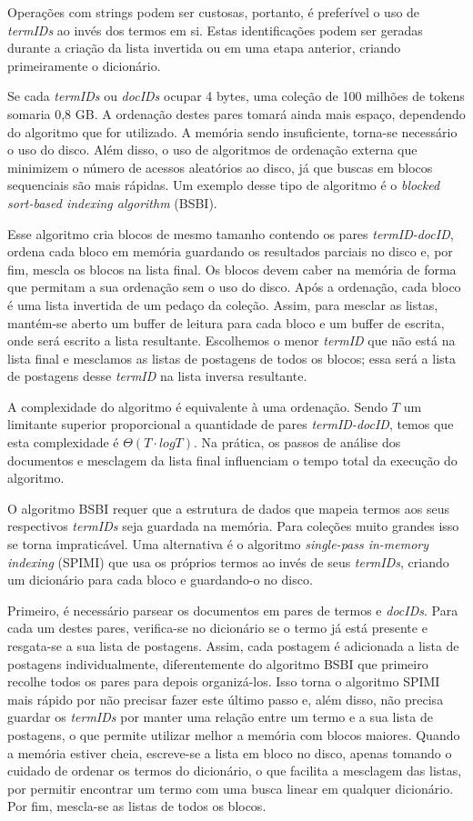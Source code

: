 Operações com strings podem ser custosas, portanto, é preferível o uso de \emph{termIDs} ao invés dos termos em si. Estas identificações podem ser geradas durante a criação da lista invertida ou em uma etapa anterior, criando primeiramente o dicionário.

Se cada \emph{termIDs} ou \emph{docIDs} ocupar 4 bytes, uma coleção de 100 milhões de tokens somaria 0,8 GB. A ordenação destes pares tomará ainda mais espaço, dependendo do algoritmo que for utilizado. A memória sendo insuficiente, torna-se necessário o uso do disco. Além disso, o uso de algoritmos de ordenação externa que minimizem o número de acessos aleatórios ao disco, já que buscas em blocos sequenciais são mais rápidas. Um exemplo desse tipo de algoritmo é o \emph{blocked sort-based indexing algorithm} (BSBI). 

Esse algoritmo cria blocos de mesmo tamanho contendo os pares \emph{termID-docID}, ordena cada bloco em memória guardando os resultados parciais no disco e, por fim, mescla os blocos na lista final. Os blocos devem caber na memória de forma que permitam a sua ordenação sem o uso do disco. Após a ordenação, cada bloco é uma lista invertida de um pedaço da coleção. Assim, para mesclar as listas, mantém-se aberto um buffer de leitura para cada bloco e um buffer de escrita, onde será escrito a lista resultante. Escolhemos o menor \emph{termID} que não está na lista final e mesclamos as listas de postagens de todos os blocos; essa será a lista de postagens desse \emph{termID} na lista inversa resultante. 

A complexidade do algoritmo é equivalente à uma ordenação. Sendo $T$ um limitante superior proporcional a quantidade de pares \emph{termID-docID}, temos que esta complexidade é $\Theta( T \cdot log T )$. Na prática, os passos de análise dos documentos e mesclagem da lista final influenciam o tempo total da execução do algoritmo.

O algoritmo BSBI requer que a estrutura de dados que mapeia termos aos seus respectivos \emph{termIDs} seja guardada na memória. Para coleções muito grandes isso se torna impraticável. Uma alternativa é o algoritmo \emph{single-pass in-memory indexing} (SPIMI) que usa os próprios termos ao invés de seus \emph{termIDs}, criando um dicionário para cada bloco e guardando-o no disco. 

Primeiro, é necessário parsear os documentos em pares de termos e \emph{docIDs}. Para cada um destes pares, verifica-se no dicionário se o termo já está presente e resgata-se a sua lista de postagens. Assim, cada postagem é adicionada a lista de postagens individualmente, diferentemente do algoritmo BSBI que primeiro recolhe todos os pares para depois organizá-los. Isso torna o algoritmo SPIMI mais rápido por não precisar fazer este último passo e, além disso, não precisa guardar os \emph{termIDs} por manter uma relação entre um termo e a sua lista de postagens, o que permite utilizar melhor a memória com blocos maiores. Quando a memória estiver cheia, escreve-se a lista em bloco no disco, apenas tomando o cuidado de ordenar os termos do dicionário, o que facilita a mesclagem das listas, por permitir encontrar um termo com uma busca linear em qualquer dicionário. Por fim, mescla-se as listas de todos os blocos. 

